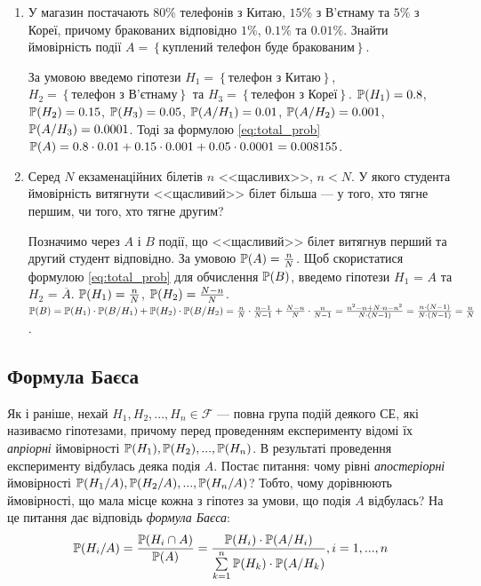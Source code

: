 \begin{example}
    \begin{enumerate}
        \item У магазин постачають $80\%$ телефонів з Китаю, $15\%$ з В'єтнаму та $5\%$ з Кореї,
        причому бракованих відповідно $1\%$, $0.1\%$ та $0.01\%$.
        Знайти ймовірність події $A = \left\{ \text{куплений телефон буде бракованим}\right\}$.

        За умовою введемо гіпотези $H_1 = \left\{ \text{телефон з Китаю}\right\}$,
        $H_2 = \left\{ \text{телефон з В'єтнаму}\right\}$ та $H_3 = \left\{ \text{телефон з Кореї}\right\}$.
        $\P(H_1) = 0.8$, $\P(H_2) = 0.15$, $\P(H_3) = 0.05$,
        $\P(A/H_1) = 0.01$, $\P(A/H_2) = 0.001$, $\P(A/H_3) = 0.0001$.
        Тоді за формулою \eqref{eq:total_prob} $\P(A) = 0.8\cdot 0.01 + 0.15\cdot 0.001 + 0.05\cdot 0.0001 = 0.008155$.
        \item Серед $N$ екзаменаційних білетів $n$ <<щасливих>>, $n<N$.
        У якого студента ймовірність витягнути <<щасливий>> білет більша --- у того, хто тягне першим, чи того, хто тягне другим?

        Позначимо через $A$ і $B$ події, що <<щасливий>> білет витягнув перший та другий студент відповідно. За умовою $\P(A) = \frac{n}{N}$.
        Щоб скористатися формулою \eqref{eq:total_prob} для обчислення $\P(B)$, введемо гіпотези $H_1$ = $A$ та $H_2$ = $\overline{A}$.
        $\P(H_1) = \frac{n}{N}$, $\P(H_2) = \frac{N-n}{N}$.
        \\ $\P(B) = \P(H_1)\cdot \P(B/H_1) + \P(H_2)\cdot \P(B/H_2) = \frac{n}{N}\cdot \frac{n-1}{N-1} + \frac{N-n}{N}\cdot \frac{n}{N-1} = 
        \frac{n^2 - n + N\cdot n - n^2}{N\cdot(N-1)} = \frac{n\cdot (N-1)}{N\cdot(N-1)} = \frac{n}{N}$.
    \end{enumerate}
\end{example}

\subsection{Формула Баєса}
Як і раніше, нехай $H_1, H_2, ..., H_n \in \mathcal{F}$ --- повна група подій деякого СЕ, які називаємо гіпотезами, причому
перед проведенням експерименту відомі їх \emph{апріорні} ймовірності $\P(H_1), \P(H_2), ..., \P(H_n)$.
В результаті проведення експерименту відбулась деяка подія $A$.
Постає питання: чому рівні \emph{апостеріорні} ймовірності $\P(H_1/A), \P(H_2/A), ..., \P(H_n/A)$?
Тобто, чому дорівнюють ймовірності, що мала місце кожна з гіпотез за умови, що подія $A$ відбулась? На це питання дає відповідь \emph{формула Баєса}:
\begin{equation}\label{eq:bayes}
    \P(H_i/A) = \frac{\P(H_i \cap A)}{\P(A)} = \frac{\P(H_i) \cdot \P(A/H_i)}{\sum\limits_{k=1}^n \P(H_k)\cdot \P(A/H_k)}, i = 1,...,n
\end{equation}

